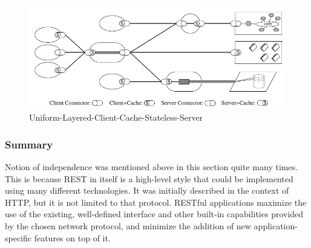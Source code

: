 \begin{center}
 \begin{figure}[h]
	\includegraphics[width=\textwidth]{../images/preliminaries/Uniform-Layered-Client-Cache-Stateless-Server.png}
	\caption{Uniform-Layered-Client-Cache-Stateless-Server \cite{Fielding2000} }
	\label{fig:Uniform-Layered-Client-Cache-Stateless-Server}
 \end{figure}
\end{center}

\subsubsection{Summary}
Notion of independence was mentioned above in this section quite many times.
This is because REST  in itself is a high-level style that could be implemented
using many different technologies. It was initially described in the context
of HTTP, but it is not limited to that protocol.
 RESTful applications maximize the use of the existing, well-defined interface
and other built-in capabilities provided by the chosen network protocol,
and minimize the addition of new application-specific features on top of
it\cite{rest_brief_intro}.



